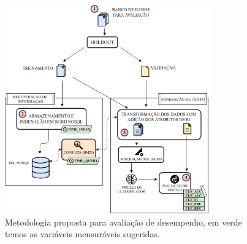 \begin{figure}[H]
    \centering
    \caption{Metodologia proposta para avaliação de desempenho, em verde temos as variáveis mensuráveis sugeridas.}
    \begin{center}
        \includegraphics[width=0.8\textwidth]{img/diagrama_da_metodologia.png}
    \end{center}
    \vspace{-0.5cm}
    \label{fig:diagrama-da-metodologia}
\end{figure}